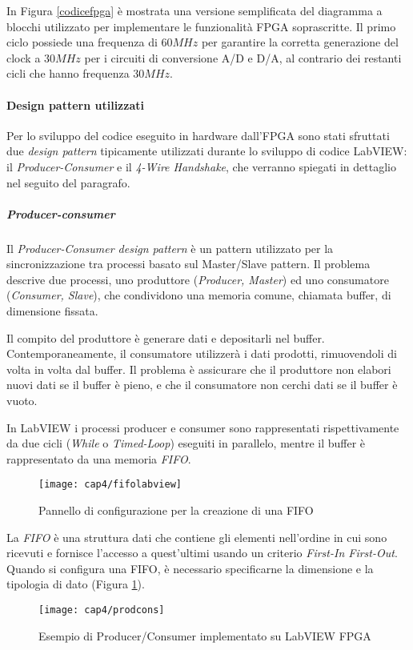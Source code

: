 In Figura \ref{codicefpga} è mostrata una versione semplificata del diagramma a blocchi utilizzato per implementare le funzionalità FPGA soprascritte. Il primo ciclo possiede una frequenza di $60MHz$ per garantire la corretta generazione del clock a $30MHz$ per i circuiti di conversione A/D e D/A, al contrario dei restanti cicli che hanno frequenza $30MHz$.



	
\paragraph{Design pattern utilizzati}
Per lo sviluppo del codice eseguito in hardware dall'FPGA sono stati sfruttati due \textit{design pattern} tipicamente utilizzati durante lo sviluppo di codice LabVIEW: il \textit{Producer-Consumer} e il \textit{4-Wire Handshake}, che verranno spiegati in dettaglio nel seguito del paragrafo.

\subparagraph{Producer-consumer}
Il \textit{Producer-Consumer design pattern} è un pattern utilizzato per la sincronizzazione tra processi basato sul Master/Slave pattern. Il problema descrive due processi, uno produttore (\textit{Producer, Master}) ed uno consumatore (\textit{Consumer, Slave}), che condividono una memoria comune, chiamata buffer, di dimensione fissata. 

Il compito del produttore è generare dati e depositarli nel buffer. Contemporaneamente, il consumatore utilizzerà i dati prodotti, rimuovendoli di volta in volta dal buffer. Il problema è assicurare che il produttore non elabori nuovi dati se il buffer è pieno, e che il consumatore non cerchi dati se il buffer è vuoto.

In LabVIEW i processi producer e consumer sono rappresentati rispettivamente da due cicli (\textit{While} o \textit{Timed-Loop}) eseguiti in parallelo, mentre il buffer è rappresentato da una memoria \textit{FIFO}. 
\begin{figure}[H]  
  \begin{center}
    \texttt{[image: cap4/fifolabview]}
    \caption{Pannello di configurazione per la creazione di una FIFO}
    \label{fifolabview}
  \end{center}
\end{figure}

La \textit{FIFO} è una struttura dati che contiene gli elementi nell'ordine in cui sono ricevuti e fornisce l'accesso a quest'ultimi usando un criterio \textit{First-In First-Out}. Quando si configura una FIFO, è necessario specificarne la dimensione e la tipologia di dato (Figura \ref{fifolabview}).
\begin{figure}
  \begin{center}
    \texttt{[image: cap4/prodcons]}
    \caption{Esempio di Producer/Consumer implementato su LabVIEW FPGA}
    \label{prodcons}
  \end{center}
\end{figure}

